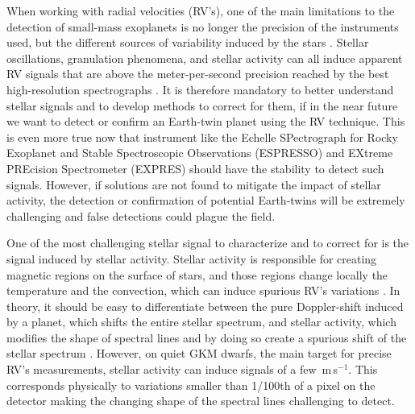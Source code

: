 \documentclass{aa}
\def\ms{\hbox{\,m\,s$^{-1}$}}         %
\begin{document}
When working with radial velocities (RV's), one of the main limitations to the detection of small-mass exoplanets is no longer the precision of the instruments used, but the different sources of variability induced by the stars \citep[e.g.][]{Feng:2017aa, Dumusque:2017aa, Rajpaul-2015, Robertson-2014}. 
Stellar oscillations, granulation phenomena, and stellar activity can all induce apparent RV signals \citep[e.g.][]{Saar-1997b, Queloz-2001, Desort-2007, Dumusque-2011a, Dumusque-2016a} that are above the meter-per-second precision reached by the best high-resolution spectrographs \citep[HARPS, HARPS-N,][]{Mayor-2003,Cosentino-2012}.
%
It is therefore mandatory to better understand stellar signals and to develop methods to correct for them, if in the near future we want to detect or confirm an Earth-twin planet using the RV technique. This is even more true now that instrument like the Echelle SPectrograph for Rocky Exoplanet and Stable Spectroscopic Observations (ESPRESSO) \citep{Pepe-2014} and EXtreme PREcision Spectrometer (EXPRES) \citep{fischer2016state} should have the stability to detect such signals. However, if solutions are not found to mitigate the impact of stellar activity, the detection or confirmation of potential Earth-twins will be extremely challenging and false detections could plague the field.


One of the most challenging stellar signal to characterize and to correct for is the signal induced by stellar activity. 
Stellar activity is responsible for creating magnetic regions on the surface of stars, and those regions change locally the temperature and the convection, which can induce spurious RV's variations \citep{Meunier-2010a, Dumusque-2014b}. 
In theory, it should be easy to differentiate between the pure Doppler-shift induced by a planet, which shifts the entire stellar spectrum, and stellar activity, which modifies the shape of spectral lines and by doing so create a spurious shift of the stellar spectrum \citep{Saar-1997b,Hatzes-2002,Kurster2003,Lindegren-2003,Desort-2007,Lagrange-2010,Meunier-2010a,Dumusque-2014b}. 
However, on quiet GKM dwarfs, the main target for precise RV's measurements, stellar activity can induce signals of a few \ms. This corresponds physically to variations smaller than 1/100th of a pixel on the detector making the changing shape of the spectral lines challenging to detect.
\end{document}
